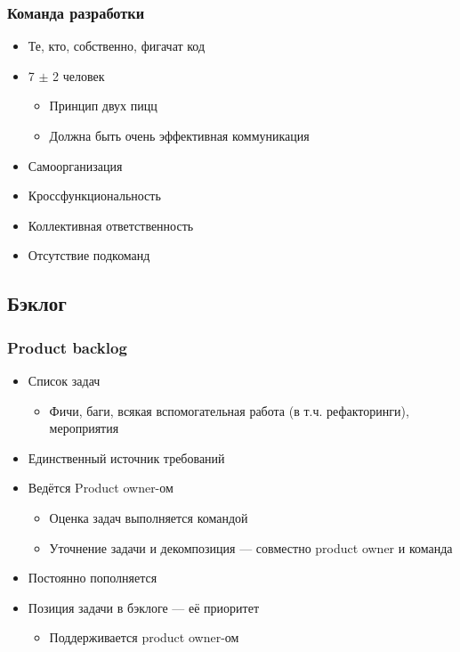 \documentclass[xetex,mathserif,serif]{beamer}
\begin{document}
    \begin{frame}
        \frametitle{Команда разработки}
        \begin{itemize}
            \item Те, кто, собственно, фигачат код
            \item 7 $\pm$ 2 человек
            \begin{itemize}
                \item Принцип двух пицц
                \item Должна быть очень эффективная коммуникация
            \end{itemize}
            \item Самоорганизация
            \item Кроссфункциональность
            \item Коллективная ответственность
            \item Отсутствие подкоманд
        \end{itemize}
    \end{frame}

    \subsection{Бэклог}

    \begin{frame}
        \frametitle{Product backlog}
        \begin{itemize}
            \item Список задач
            \begin{itemize}
                \item Фичи, баги, всякая вспомогательная работа (в т.ч. рефакторинги), мероприятия
            \end{itemize}
            \item Единственный источник требований
            \item Ведётся Product owner-ом
            \begin{itemize}
                \item Оценка задач выполняется командой
                \item Уточнение задачи и декомпозиция --- совместно product owner и команда
            \end{itemize}
            \item Постоянно пополняется
            \item Позиция задачи в бэклоге --- её приоритет
            \begin{itemize}
                \item Поддерживается product owner-ом
            \end{itemize}
        \end{itemize}
    \end{frame}
\end{document}
